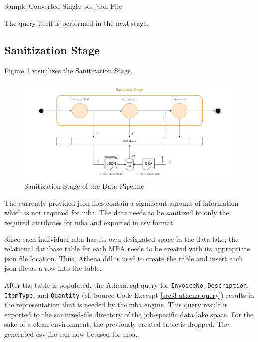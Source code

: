 \begin{longlisting}
	\inputminted{json}{main-matter/src/3-json.json}
	\caption{Sample Converted Single-\acs{pos} \acs{json} File}
	\label{src:3-json}
\end{longlisting}

The query itself is performed in the next stage.

\subsection{Sanitization Stage}
Figure \ref{fig:3-sanitize} visualizes the Sanitization Stage.

\begin{figure}[h!]
	\includegraphics[width=\linewidth]{main-matter/img/3-3-3-sanitize.pdf}
	\caption{Sanitization Stage of the Data Pipeline}
	\label{fig:3-sanitize}	
\end{figure}

The currently provided \ac{json} files contain a significant amount of information which is not required for \ac{mba}. The data needs to be sanitized to only the required attributes for \ac{mba} and exported in \ac{csv} format.

Since each individual \ac{mba} has its own designated space in the data lake, the relational database table for each MBA needs to be created with its appropriate \ac{json} file location. Thus, Athena \ac{ddl} is used to create the table and insert each \ac{json} file as a row into the table.

After the table is populated, the Athena \ac{sql} query for \texttt{InvoiceNo}, \texttt{Description}, \texttt{ItemType}, and \texttt{Quantity} (cf. Source Code Excerpt \ref{src:3-athena-query}) results in the representation that is needed by the \ac{mba} engine. This query result is exported to the sanitized-file directory of the job-specific data lake space. For the sake of a clean environment, the previously created table is dropped. The generated \ac{csv} file can now be used for \ac{mba}.

